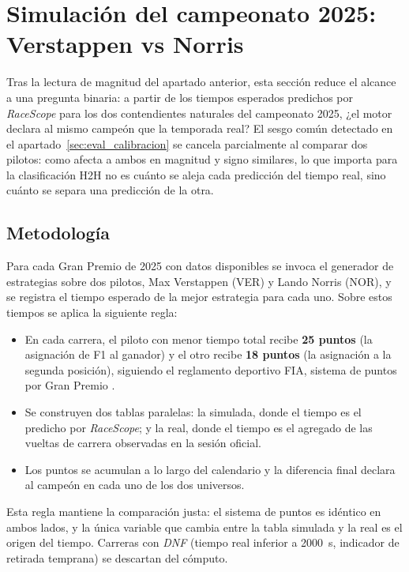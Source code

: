 \section{Simulación del campeonato 2025: Verstappen vs Norris}
\label{sec:campeonato_ver_nor}

Tras la lectura de magnitud del apartado anterior, esta sección reduce el alcance a una pregunta binaria: a partir de los tiempos esperados predichos por \textit{RaceScope} para los dos contendientes naturales del campeonato 2025, ¿el motor declara al mismo campeón que la temporada real? El sesgo común detectado en el apartado~\ref{sec:eval_calibracion} se cancela parcialmente al comparar dos pilotos: como afecta a ambos en magnitud y signo similares, lo que importa para la clasificación H2H no es cuánto se aleja cada predicción del tiempo real, sino cuánto se separa una predicción de la otra.

\subsection{Metodología}
\label{ssec:metodologia_campeonato}

Para cada Gran Premio de 2025 con datos disponibles se invoca el generador de estrategias sobre dos pilotos, Max Verstappen (VER) y Lando Norris (NOR), y se registra el tiempo esperado de la mejor estrategia para cada uno. Sobre estos tiempos se aplica la siguiente regla:

\begin{itemize}
    \item En cada carrera, el piloto con menor tiempo total recibe \textbf{25 puntos} (la asignación de F1 al ganador) y el otro recibe \textbf{18 puntos} (la asignación a la segunda posición), siguiendo el reglamento deportivo FIA, sistema de puntos por Gran Premio \cite[Art.~A2.2.1]{fia2026general}.
    \item Se construyen dos tablas paralelas: la simulada, donde el tiempo es el predicho por \textit{RaceScope}; y la real, donde el tiempo es el agregado de las vueltas de carrera observadas en la sesión oficial.
    \item Los puntos se acumulan a lo largo del calendario y la diferencia final declara al campeón en cada uno de los dos universos.
\end{itemize}

Esta regla mantiene la comparación justa: el sistema de puntos es idéntico en ambos lados, y la única variable que cambia entre la tabla simulada y la real es el origen del tiempo. Carreras con \textit{DNF} (tiempo real inferior a \SI{2000}{\second}, indicador de retirada temprana) se descartan del cómputo.

